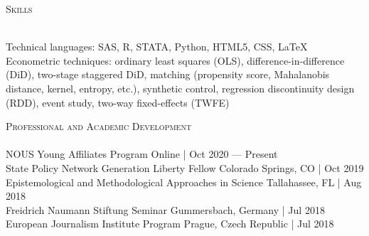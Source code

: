 \documentclass[a4paper,11pt]{article}
\newcommand{\lineunder} {
    \vspace*{-8pt} \\
    \hspace*{-18pt} \hrulefill \\
}
\newcommand{\header} [1] {
    {\hspace*{-18pt}\vspace*{6pt} \textsc{\large{#1}}}
    \vspace*{-6pt} \lineunder
}
\begin{document}
\header{Skills}
\vspace{1mm}

Technical languages: SAS, R, STATA, Python, HTML5, CSS, \LaTeX \\

\vspace{1mm}
Econometric techniques: ordinary least squares (OLS), difference-in-difference (DiD), two-stage staggered DiD, matching (propensity score, Mahalanobis distance, kernel, entropy, etc.), synthetic control, regression discontinuity design (RDD), event study, two-way fixed-effects (TWFE)
\vspace{2mm}

\header{Professional and Academic Development}
\vspace{1mm}
NOUS Young Affiliates Program \hfill Online | Oct 2020 --- Present \\
\vspace{1mm}
State Policy Network Generation Liberty Fellow \hfill Colorado Springs, CO | Oct 2019 \\
\vspace{1mm}
Epistemological and Methodological Approaches in Science \hfill Tallahassee, FL | Aug 2018\\
\vspace{1mm}
Freidrich Naumann Stiftung Seminar \hfill Gummersbach, Germany | Jul 2018\\
\vspace{1mm}
European Journalism Institute Program \hfill Prague, Czech Republic | Jul 2018
\end{document}
